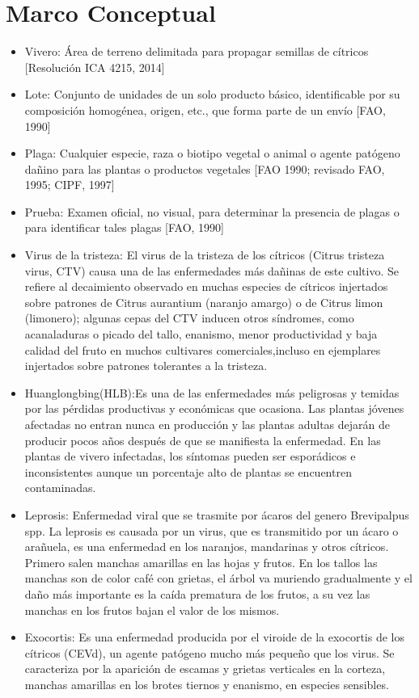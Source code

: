 \section{Marco Conceptual}
\begin{itemize}
\item Vivero: \'{A}rea de terreno delimitada para propagar semillas de c\'{i}tricos [Resoluci\'{o}n ICA 4215, 2014]
\item Lote: Conjunto de unidades de un solo producto b\'{a}sico, identificable por su composici\'{o}n homog\'{e}nea, origen, etc., que forma parte de un env\'{i}o [FAO, 1990] 
\item Plaga: Cualquier especie, raza o biotipo vegetal o animal o agente pat\'{o}geno da\~{n}ino para las plantas o productos vegetales [FAO 1990; revisado FAO, 1995; CIPF, 1997] 
\item Prueba: Examen oficial, no visual, para determinar la presencia de plagas o para identificar tales plagas [FAO, 1990] 
\item Virus de la tristeza: El virus de la tristeza de los c\'{i}tricos (Citrus tristeza virus, CTV) causa una de las enfermedades m\'{a}s
da\~{n}inas de este cultivo. Se refiere al decaimiento observado en muchas especies de c\'{i}tricos injertados sobre patrones de Citrus aurantium (naranjo amargo) o de Citrus limon (limonero); algunas cepas del CTV inducen otros s\'{i}ndromes, como acanaladuras o picado del tallo, enanismo, menor productividad y baja calidad del fruto en muchos cultivares comerciales,incluso en ejemplares injertados sobre patrones tolerantes a la tristeza.\cite{CTV}
\item Huanglongbing(HLB):Es una de las enfermedades m\'{a}s peligrosas y temidas por las p\'{e}rdidas productivas y econ\'{o}micas que ocasiona. Las plantas j\'{o}venes afectadas no entran nunca en producci\'{o}n y las plantas adultas dejar\'{a}n de producir pocos a\~{n}os despu\'{e}s de que se manifiesta la enfermedad. En las plantas de vivero infectadas, los s\'{i}ntomas pueden ser espor\'{a}dicos e inconsistentes aunque un porcentaje alto de plantas se encuentren contaminadas.\cite{HLB}
\item Leprosis: Enfermedad viral que se trasmite por \'{a}caros del genero Brevipalpus spp. La leprosis es causada por un virus, que es transmitido por un \'{a}caro o ara\~{n}uela, es una enfermedad en los naranjos, mandarinas y otros c\'{i}tricos. Primero salen manchas amarillas en las hojas y frutos. En los tallos las manchas son de color caf\'{e} con grietas, el \'{a}rbol va muriendo gradualmente y el da\~{n}o m\'{a}s importante es la ca\'{i}da prematura de los frutos, a su vez las manchas en los frutos bajan el valor de los mismos.\cite{LEP}
\item Exocortis: Es una enfermedad producida por el viroide de la exocortis de los c\'{i}tricos (CEVd), un agente pat\'{o}geno mucho m\'{a}s peque\~{n}o que los virus. Se caracteriza por la aparici\'{o}n de escamas y grietas verticales en la corteza, manchas amarillas en los brotes tiernos y enanismo, en especies sensibles.\cite{EXO}
\end{itemize}

